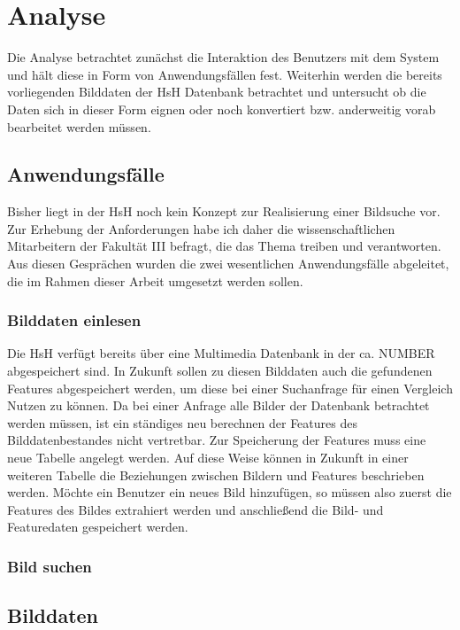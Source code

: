 \chapter{Analyse}

Die Analyse betrachtet zunächst die Interaktion des Benutzers mit dem System und hält diese in Form von Anwendungsfällen fest. Weiterhin werden die bereits vorliegenden Bilddaten der HsH Datenbank betrachtet und untersucht ob die Daten sich in dieser Form eignen oder noch konvertiert bzw. anderweitig vorab bearbeitet werden müssen. 

\section{Anwendungsfälle}

Bisher liegt in der HsH noch kein Konzept zur Realisierung einer Bildsuche vor. Zur Erhebung der Anforderungen habe ich daher die wissenschaftlichen Mitarbeitern der Fakultät III befragt, die das Thema treiben und verantworten. Aus diesen Gesprächen wurden die zwei wesentlichen Anwendungsfälle abgeleitet, die im Rahmen dieser Arbeit umgesetzt werden sollen.

\subsection{Bilddaten einlesen}

Die HsH verfügt bereits über eine Multimedia Datenbank in der ca. NUMBER abgespeichert sind. In Zukunft sollen zu diesen Bilddaten auch die gefundenen Features abgespeichert werden, um diese bei einer Suchanfrage für einen Vergleich Nutzen zu können. Da bei einer Anfrage alle Bilder der Datenbank betrachtet werden müssen, ist ein ständiges neu berechnen der Features des Bilddatenbestandes nicht vertretbar. Zur Speicherung der Features muss eine neue Tabelle angelegt werden. Auf diese Weise können in Zukunft in einer weiteren Tabelle die Beziehungen zwischen Bildern und Features beschrieben werden. Möchte ein Benutzer ein neues Bild hinzufügen,  
so müssen also zuerst die Features des Bildes extrahiert werden und anschließend die Bild- und Featuredaten gespeichert werden.

\subsection{Bild suchen}



\section{Bilddaten}

